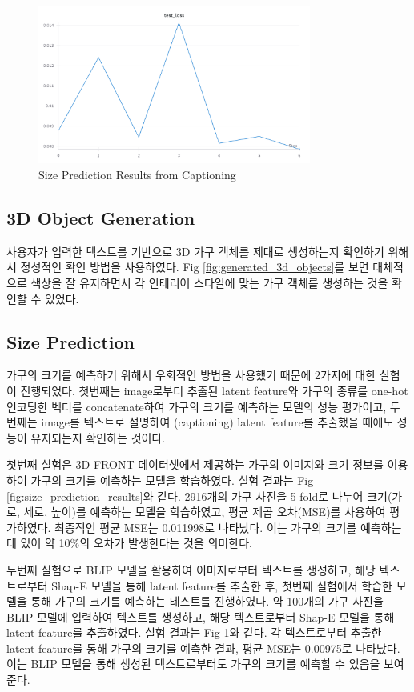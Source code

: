 \documentclass[11pt]{article}
\begin{document}
\begin{figure}[htbp]
    \centering
    \includegraphics[width=0.8\textwidth]{figures/size_prediction_results_from_captioning.png}
    \caption{Size Prediction Results from Captioning}
    \label{fig:size_prediction_results_from_captioning}
\end{figure}

\clearpage

\subsection{3D Object Generation}
사용자가 입력한 텍스트를 기반으로 3D 가구 객체를 제대로 생성하는지 확인하기 위해서 정성적인 확인 방법을 사용하였다.
Fig \ref{fig:generated_3d_objects}를 보면 대체적으로 색상을 잘 유지하면서 각 인테리어 스타일에 맞는 가구 객체를 생성하는 것을 확인할 수 있었다.


\subsection{Size Prediction}
가구의 크기를 예측하기 위해서 우회적인 방법을 사용했기 때문에 2가지에 대한 실험이 진행되었다.
첫번째는 image로부터 추출된 latent feature와 가구의 종류를 one-hot 인코딩한 벡터를 concatenate하여 가구의 크기를 예측하는 모델의 성능 평가이고, 두번째는 image를 텍스트로 설명하여 (captioning) latent feature를 추출했을 때에도 성능이 유지되는지 확인하는 것이다.

첫번째 실험은 3D-FRONT 데이터셋에서 제공하는 가구의 이미지와 크기 정보를 이용하여 가구의 크기를 예측하는 모델을 학습하였다.
실험 결과는 Fig \ref{fig:size_prediction_results}와 같다. 
2916개의 가구 사진을 5-fold로 나누어 크기(가로, 세로, 높이)를 예측하는 모델을 학습하였고, 평균 제곱 오차(MSE)를 사용하여 평가하였다.
최종적인 평균 MSE는 0.011998로 나타났다. 이는 가구의 크기를 예측하는데 있어 약 10\%의 오차가 발생한다는 것을 의미한다.


두번째 실험으로 BLIP\cite{li2022blip} 모델을 활용하여 이미지로부터 텍스트를 생성하고, 해당 텍스트로부터 Shap-E 모델을 통해 latent feature를 추출한 후, 첫번째 실험에서 학습한 모델을 통해 가구의 크기를 예측하는 테스트를 진행하였다.
약 100개의 가구 사진을 BLIP 모델에 입력하여 텍스트를 생성하고, 해당 텍스트로부터 Shap-E 모델을 통해 latent feature를 추출하였다.
실험 결과는 Fig \ref{fig:size_prediction_results_from_captioning}와 같다.
각 텍스트로부터 추출한 latent feature를 통해 가구의 크기를 예측한 결과, 평균 MSE는 0.00975로 나타났다. 이는 BLIP 모델을 통해 생성된 텍스트로부터도 가구의 크기를 예측할 수 있음을 보여준다.
\end{document}
